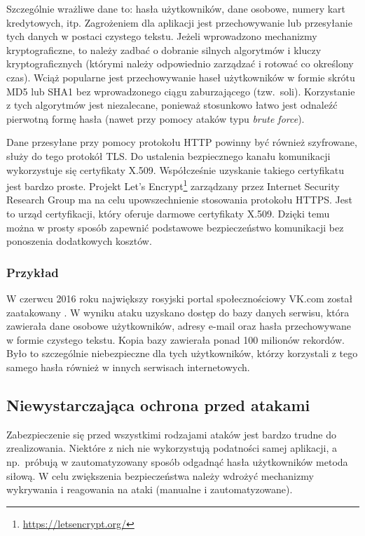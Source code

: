 \documentclass[11pt,a4paper,polish,thesis]{dcsbook}
\begin{document}
Szczególnie wrażliwe dane to: hasła użytkowników, dane osobowe, numery kart kredytowych, itp. Zagrożeniem dla aplikacji jest przechowywanie lub przesyłanie tych danych w postaci czystego tekstu. Jeżeli wprowadzono mechanizmy kryptograficzne, to należy zadbać o dobranie silnych algorytmów i kluczy kryptograficznych (którymi należy odpowiednio zarządzać i rotować co określony czas). Wciąż popularne jest przechowywanie haseł użytkowników w formie skrótu MD5 lub SHA1 bez wprowadzonego ciągu zaburzającego (tzw.~soli). Korzystanie z tych algorytmów jest niezalecane, ponieważ stosunkowo łatwo jest odnaleźć pierwotną formę hasła (nawet przy pomocy ataków typu \textit{brute force}). 

Dane przesyłane przy pomocy protokołu HTTP powinny być również szyfrowane, służy do tego protokół TLS. Do ustalenia bezpiecznego kanału komunikacji wykorzystuje się certyfikaty X.509. Współcześnie uzyskanie takiego certyfikatu jest bardzo proste. Projekt Let's Encrypt\footnote{\url{https://letsencrypt.org/}} zarządzany przez Internet Security Research Group ma na celu upowszechnienie stosowania protokołu HTTPS. Jest to urząd certyfikacji, który oferuje darmowe certyfikaty X.509. Dzięki temu można w prosty sposób zapewnić podstawowe bezpieczeństwo komunikacji bez ponoszenia dodatkowych kosztów.

\subsubsection*{Przykład}
W czerwcu 2016 roku największy rosyjski portal społecznościowy VK.com został zaatakowany \cite{vk}. W wyniku ataku uzyskano dostęp do bazy danych serwisu, która zawierała dane osobowe użytkowników, adresy e-mail oraz hasła przechowywane w formie czystego tekstu. Kopia bazy zawierała ponad 100 milionów rekordów. Było to szczególnie niebezpieczne dla tych użytkowników, którzy korzystali z tego samego hasła również w innych serwisach internetowych. 


\subsection{Niewystarczająca ochrona przed atakami}
Zabezpieczenie się przed wszystkimi rodzajami ataków jest bardzo trudne do zrealizowania. Niektóre z nich nie wykorzystują podatności samej aplikacji, a np.~próbują w zautomatyzowany sposób odgadnąć hasła użytkowników metoda siłową. W celu zwiększenia bezpieczeństwa należy wdrożyć mechanizmy wykrywania i reagowania na ataki (manualne i zautomatyzowane).
\end{document}
